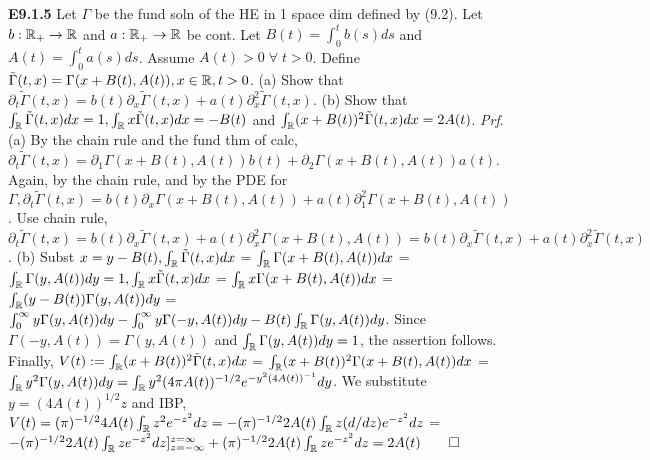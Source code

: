 {\bf E9.1.5} Let $\Gamma$ be the fund soln of the HE in 1 space dim defined by (9.2). Let $b: \mathbb{R}_+ \rightarrow \mathbb{R}$ and $a: \mathbb{R}_+ \rightarrow \mathbb{R}$ be cont. Let $B(t) = \int_0^t b(s) ds$ and $A(t) = \int_0^t a(s) ds$. Assume $A(t) > 0\; \forall \; t>0$. Define $\tilde{\Gamma} (t,x) = \Gamma(x+B(t), A(t)), x \in \mathbb{R}, t>0$. (a) Show that $\partial_t \tilde{\Gamma}(t,x) = b(t)\partial_x\tilde{\Gamma}(t,x) + a(t) \partial_x^2 \tilde{\Gamma}(t,x)$. (b) Show that $\int_{\mathbb{R}}\tilde{\Gamma}(t,x)dx=1, \int_{\mathbb{R}}x \tilde{\Gamma}(t,x)dx=-B(t)$ and $\int_{\mathbb{R}} (x+ B(t))^2\tilde{\Gamma}(t,x)dx=2 A(t)$. 
{\it Prf}. (a) By the chain rule and the fund thm of calc, $\partial_t \tilde{\Gamma}(t,x) = \partial_1 \Gamma(x + B(t), A(t))b(t) + \partial_2 \Gamma(x + B(t), A(t))a(t)$. Again, by the chain rule, and by the PDE for $\Gamma, \partial_t \tilde{\Gamma}(t,x) = b(t) \partial_x \Gamma(x+B(t), A(t)) + a(t) \partial_1^2 \Gamma(x+B(t), A(t))$. Use chain rule, $\partial_t \tilde{\Gamma}(t,x) = b(t)\partial_x \tilde{\Gamma}(t,x) + a(t) \partial_x^2 \Gamma(x+B(t), A(t)) = b(t)\partial_x \tilde{\Gamma}(t,x) + a(t) \partial_x^2 \tilde{\Gamma}(t, x)$. (b) Subst $x = y - B(t), \int_{\mathbb{R}} \tilde{\Gamma}(t,x) dx$ = $\int_{\mathbb{R}} \Gamma (x + B(t), A(t)) dx$ = $\int_{\mathbb{R}}\Gamma(y, A(t))dy = 1, \int_{\mathbb{R}} x \tilde{\Gamma}(t,x) dx$ = $ \int_{\mathbb{R}} x \Gamma (x + B(t), A(t)) dx$ = $\int_{\mathbb{R}}(y-B(t))\Gamma(y, A(t))dy$ = $\int_0^{\infty} y \Gamma (y, A(t))dy - \int_0^{\infty} y \Gamma (-y, A(t))dy - B(t) \int_{\mathbb{R}} \Gamma(y, A(t))dy$. Since $\Gamma( -y, A(t)) = \Gamma (y, A(t))$ and $\int_{\mathbb{R}} \Gamma(y, A(t))dy = 1$, the assertion follows.  Finally, $V(t) := \int_{\mathbb{R}} (x + B(t))^2 \tilde{\Gamma} (t,x) dx$ = $\int_{\mathbb{R}} (x + B(t))^2 \Gamma (x + B(t), A(t)) dx$ = $\int_{\mathbb{R}} y^2 \Gamma (y, A(t)) dy = \int_{\mathbb{R}} y^2 (4 \pi A(t))^{-1/2} e^{-y^2(4A(t))^{-1}} dy$.  We substitute $y = (4 A(t))^{1/2} z$ and IBP, $V(t) = (\pi)^{-1/2} 4 A(t) \int_{\mathbb{R}} z^2 e^{-z^2}dz = - (\pi)^{-1/2} 2 A(t) \int_{\mathbb{R}} z (d/dz) e^{-z^2}dz$ = $- (\pi)^{-1/2} 2 A(t) \int_{\mathbb{R}} z  e^{-z^2}dz]_{z = - \infty}^{z = \infty} +  (\pi)^{-1/2} 2 A(t) \int_{\mathbb{R}} z  e^{-z^2}dz = 2 A(t) \qed$